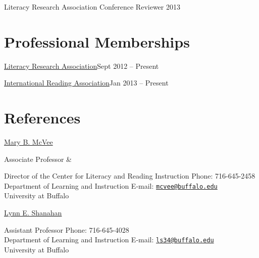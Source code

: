 \begin{innerlist}
    \item Literacy Research Association Conference Reviewer \hfill {2013}
\end{innerlist}



\section{Professional Memberships}
\begin{innerlist}
    \item \href{http://www.literacyresearchassociation.org/}{Literacy Research Association}\hfill {Sept 2012 -- Present}
    \item \href{http://www.reading.org/}{International Reading Association}\hfill {Jan 2013 -- Present}
\end{innerlist}


\section{References}
\href{http://gse.buffalo.edu/about/directory/faculty/2039}{Mary B. McVee}
\begin{innerlist}
\item[] Associate Professor \&
\item[] Director of the Center for Literacy and Reading Instruction \hfill {Phone: 716-645-2458}\\
Department of Learning and Instruction \hfill{E-mail: \href{mailto:mcvee@buffalo.edu}{\nolinkurl{mcvee@buffalo.edu}}}\\
University at Buffalo
\end{innerlist}

\href{http://gse.buffalo.edu/about/directory/faculty/2110}{Lynn E. Shanahan}
\begin{innerlist}
\item[] Assistant Professor \hfill {Phone: 716-645-4028}\\
Department of Learning and Instruction \hfill{E-mail: \href{mailto:ls34@buffalo.edu}{\nolinkurl{ls34@buffalo.edu}}}\\
University at Buffalo
\end{innerlist}
\halfblankline


\halfblankline




